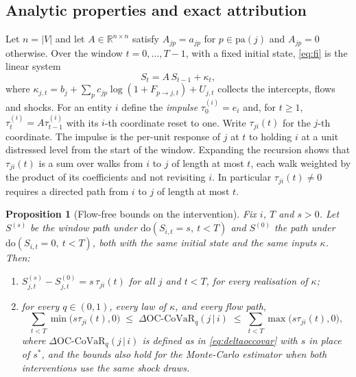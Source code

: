 \documentclass[referee,pdflatex,sn-mathphys-ay]{sn-jnl}
\theoremstyle{thmstyleone}%
\newtheorem{proposition}[theorem]{Proposition}%
\theoremstyle{thmstyletwo}%
\theoremstyle{thmstylethree}%
\newcommand{\doop}{\mathrm{do}}
\newcommand{\pa}{\mathrm{pa}}
\newcommand{\OCCoVaR}{\text{OC-CoVaR}}
\begin{document}
\subsection{Analytic properties and exact attribution}
\label{subsec:analytic}
Let $n=|V|$ and let $A\in\mathbb{R}^{n\times n}$ satisfy $A_{jp}=a_{jp}$ for
$p\in\pa(j)$ and $A_{jp}=0$ otherwise. Over the window $t=0,\dots,T-1$, with a fixed
initial state, \eqref{eq:fi} is the linear system
\begin{equation}
\label{eq:linear}
S_t = A\,S_{t-1}+\kappa_t,
\end{equation}
where $\kappa_{j,t}=b_j+\sum_p c_{jp}\log(1+F_{p\to j,t})+U_{j,t}$ collects the
intercepts, flows and shocks. For an entity $i$ define the \emph{impulse}
$\tau^{(i)}_0=e_i$ and, for $t\ge1$, $\tau^{(i)}_t=A\tau^{(i)}_{t-1}$ with its
$i$-th coordinate reset to one. Write $\tau_{ji}(t)$ for the $j$-th coordinate. The
impulse is the per-unit response of $j$ at $t$ to holding $i$ at a unit distressed
level from the start of the window. Expanding the recursion shows that $\tau_{ji}(t)$
is a sum over walks from $i$ to $j$ of length at most $t$, each walk weighted by the
product of its coefficients and not revisiting $i$. In particular $\tau_{ji}(t)\neq0$
requires a directed path from $i$ to $j$ of length at most $t$.

\begin{proposition}[Flow-free bounds on the intervention]
\label{prop:A}
Fix $i$, $T$ and $s>0$. Let $S^{(s)}$ be the window path under
$\doop(S_{i,t}=s,\ t<T)$ and $S^{(0)}$ the path under $\doop(S_{i,t}=0,\ t<T)$, both
with the same initial state and the same inputs $\kappa$. Then:
\begin{enumerate}[label=(\alph*),leftmargin=*]
\item $S^{(s)}_{j,t}-S^{(0)}_{j,t}=s\,\tau_{ji}(t)$ for all $j$ and $t<T$, for every
realisation of $\kappa$;
\item for every $q\in(0,1)$, every law of $\kappa$, and every flow path,
\begin{equation}
\label{eq:bounds}
\sum_{t<T}\min\big(s\tau_{ji}(t),0\big)\;\le\;
\Delta\OCCoVaR_q(j\,|\,i)\;\le\;\sum_{t<T}\max\big(s\tau_{ji}(t),0\big),
\end{equation}
where $\Delta\OCCoVaR_q(j\,|\,i)$ is defined as in \eqref{eq:deltaoccovar} with $s$ in
place of $s^\ast$, and the bounds also hold for the Monte-Carlo estimator when both
interventions use the same shock draws.
\end{enumerate}
\end{proposition}
\end{document}

